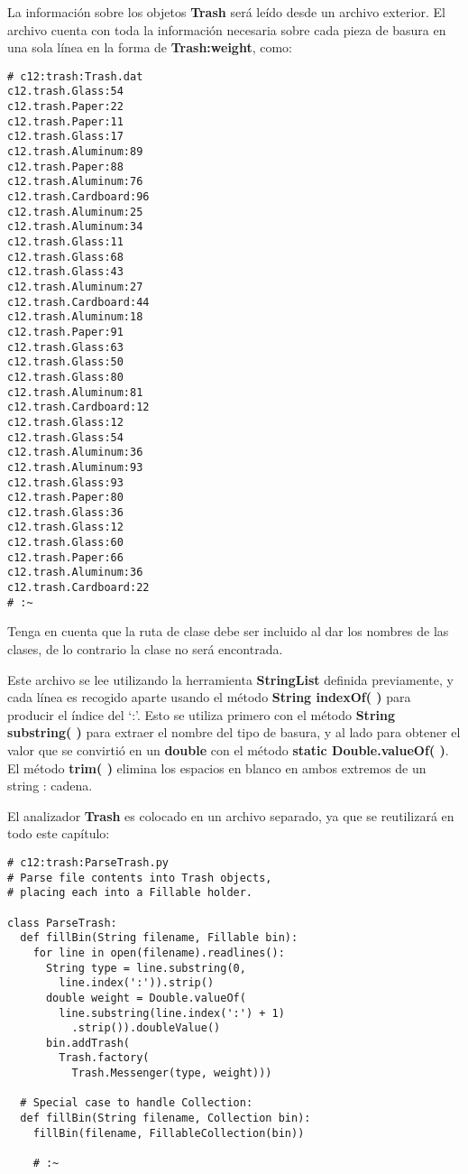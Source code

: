 La información sobre los objetos \textbf{Trash} será leído desde un archivo exterior. El archivo cuenta con toda la información necesaria sobre cada pieza de basura en una sola línea en la forma de \textbf{Trash:weight}, como:     \newline

\begin{lstlisting} 
# c12:trash:Trash.dat 
c12.trash.Glass:54 
c12.trash.Paper:22 
c12.trash.Paper:11 
c12.trash.Glass:17 
c12.trash.Aluminum:89 
c12.trash.Paper:88 
c12.trash.Aluminum:76 
c12.trash.Cardboard:96 
c12.trash.Aluminum:25 
c12.trash.Aluminum:34 
c12.trash.Glass:11 
c12.trash.Glass:68 
c12.trash.Glass:43 
c12.trash.Aluminum:27 
c12.trash.Cardboard:44 
c12.trash.Aluminum:18 
c12.trash.Paper:91 
c12.trash.Glass:63 
c12.trash.Glass:50 
c12.trash.Glass:80 
c12.trash.Aluminum:81 
c12.trash.Cardboard:12 
c12.trash.Glass:12 
c12.trash.Glass:54 
c12.trash.Aluminum:36 
c12.trash.Aluminum:93 
c12.trash.Glass:93 
c12.trash.Paper:80 
c12.trash.Glass:36 
c12.trash.Glass:12 
c12.trash.Glass:60 
c12.trash.Paper:66 
c12.trash.Aluminum:36 
c12.trash.Cardboard:22 
# :~ 
\end{lstlisting}

Tenga en cuenta que la ruta de clase debe ser incluido al dar los nombres de las clases, de lo contrario la clase no será encontrada.\newline

Este archivo se lee utilizando la herramienta \textbf{StringList} definida previamente, y cada línea es recogido aparte usando el método \textbf{String indexOf( )} para producir el índice del ‘:’. Esto se utiliza primero con el método \textbf{String substring( )} para extraer el nombre del tipo de basura,  y al lado para obtener el valor que se convirtió en un \textbf{double} con el método \textbf{static Double.valueOf( )}. El método \textbf{trim( )}  elimina los espacios en blanco en ambos extremos de un string : cadena. \newline

El analizador \textbf{Trash } es colocado en un archivo separado, ya que se reutilizará en todo este capítulo: \newline

\begin{lstlisting} 
# c12:trash:ParseTrash.py  
# Parse file contents into Trash objects, 
# placing each into a Fillable holder. 

class ParseTrash: 
  def fillBin(String filename, Fillable bin): 
    for line in open(filename).readlines(): 
      String type = line.substring(0,  
        line.index(':')).strip() 
      double weight = Double.valueOf( 
        line.substring(line.index(':') + 1) 
          .strip()).doubleValue() 
      bin.addTrash( 
        Trash.factory( 
          Trash.Messenger(type, weight))) 
          
  # Special case to handle Collection: 
  def fillBin(String filename, Collection bin): 
    fillBin(filename, FillableCollection(bin)) 
    
    # :~
\end{lstlisting}

